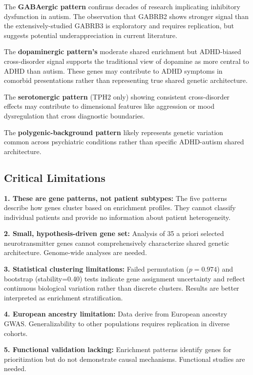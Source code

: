 \documentclass[12pt,letterpaper]{article}
\theoremstyle{definition}
\theoremstyle{remark}
\begin{document}
The \textbf{GABAergic pattern} confirms decades of research implicating inhibitory dysfunction in autism\cite{cook1998,hogart2007}. The observation that GABRB2 shows stronger signal than the extensively-studied GABRB3 is exploratory and requires replication, but suggests potential underappreciation in current literature.

The \textbf{dopaminergic pattern's} moderate shared enrichment but ADHD-biased cross-disorder signal supports the traditional view of dopamine as more central to ADHD than autism\cite{volkow2009,faraone2019}. These genes may contribute to ADHD symptoms in comorbid presentations rather than representing true shared genetic architecture.

The \textbf{serotonergic pattern} (TPH2 only) showing consistent cross-disorder effects may contribute to dimensional features like aggression or mood dysregulation that cross diagnostic boundaries\cite{zhang2024,veenstra2012}.

The \textbf{polygenic-background pattern} likely represents genetic variation common across psychiatric conditions\cite{pgc2019,lee2013} rather than specific ADHD-autism shared architecture.

\subsection{Critical Limitations}

\textbf{1. These are gene patterns, not patient subtypes:} The five patterns describe how genes cluster based on enrichment profiles. They cannot classify individual patients and provide no information about patient heterogeneity.

\textbf{2. Small, hypothesis-driven gene set:} Analysis of 35 a priori selected neurotransmitter genes cannot comprehensively characterize shared genetic architecture. Genome-wide analyses are needed.

\textbf{3. Statistical clustering limitations:} Failed permutation ($p=0.974$) and bootstrap (stability=0.40) tests indicate gene assignment uncertainty and reflect continuous biological variation rather than discrete clusters. Results are better interpreted as enrichment stratification.

\textbf{4. European ancestry limitation:} Data derive from European ancestry GWAS. Generalizability to other populations requires replication in diverse cohorts.

\textbf{5. Functional validation lacking:} Enrichment patterns identify genes for prioritization but do not demonstrate causal mechanisms. Functional studies are needed.
\end{document}
